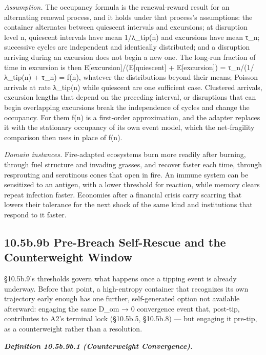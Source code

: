 \documentclass[
]{article}
\begin{document}
\emph{Assumption.} The occupancy formula is the renewal-reward result
for an alternating renewal process, and it holds under that process's
assumptions: the container alternates between quiescent intervals and
excursions; at disruption level n, quiescent intervals have mean
1/λ\_tip(n) and excursions have mean τ\_n; successive cycles are
independent and identically distributed; and a disruption arriving
during an excursion does not begin a new one. The long-run fraction of
time in excursion is then E{[}excursion{]}/(E{[}quiescent{]} +
E{[}excursion{]}) = τ\_n/(1/λ\_tip(n) + τ\_n) = f(n), whatever the
distributions beyond their means; Poisson arrivals at rate λ\_tip(n)
while quiescent are one sufficient case. Clustered arrivals, excursion
lengths that depend on the preceding interval, or disruptions that can
begin overlapping excursions break the independence of cycles and change
the occupancy. For them f(n) is a first-order approximation, and the
adapter replaces it with the stationary occupancy of its own event
model, which the net-fragility comparison then uses in place of f(n).

\emph{Domain instances.} Fire-adapted ecosystems burn more readily after
burning, through fuel structure and invading grasses, and recover faster
each time, through resprouting and serotinous cones that open in fire.
An immune system can be sensitized to an antigen, with a lower threshold
for reaction, while memory clears repeat infection faster. Economies
after a financial crisis carry scarring that lowers their tolerance for
the next shock of the same kind and institutions that respond to it
faster.

\hypertarget{b.9b-pre-breach-self-rescue-and-the-counterweight-window}{%
\subsection{10.5b.9b Pre-Breach Self-Rescue and the Counterweight
Window}\label{b.9b-pre-breach-self-rescue-and-the-counterweight-window}}

§10.5b.9's thresholds govern what happens once a tipping event is
already underway. Before that point, a high-entropy container that
recognizes its own trajectory early enough has one further,
self-generated option not available afterward: engaging the same D\_om →
0 convergence event that, post-tip, contributes to A2's terminal lock
(§10.5b.5, §10.5b.8) --- but engaging it pre-tip, as a counterweight
rather than a resolution.

\emph{\textbf{Definition 10.5b.9b.1 (Counterweight Convergence).}}
\end{document}
